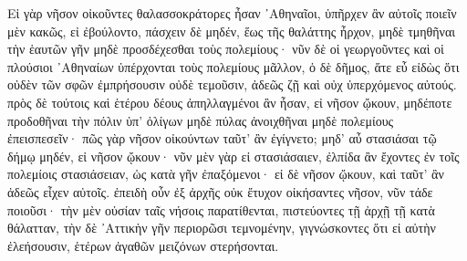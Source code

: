 {\large
\begin{greek}
\noindent Eἰ γὰρ νῆσον οἰκοῦντες θαλασσοκράτορες ἦσαν ᾿Αθηναῖοι, ὑπῆρχεν ἂν αὐτοῖς ποιεῖν μὲν κακῶς, εἰ ἐβούλοντο, πάσχειν δὲ μηδέν, ἕως τῆς θαλάττης ἦρχον, μηδὲ τμηθῆναι τὴν ἑαυτῶν γῆν μηδὲ προσδέχεσθαι τοὺς πολεμίους· νῦν δὲ οἱ γεωργοῦντες καὶ οἱ πλούσιοι ᾿Αθηναίων ὑπέρχονται τοὺς πολεμίους μᾶλλον, ὁ δὲ δῆμος, ἅτε εὖ εἰδὼς ὅτι οὐδὲν τῶν σφῶν ἐμπρήσουσιν οὐδὲ τεμοῦσιν, ἀδεῶς ζῇ καὶ οὐχ ὑπερχόμενος αὐτούς. πρὸς δὲ τούτοις καὶ ἑτέρου δέους ἀπηλλαγμένοι ἂν ἦσαν, εἰ νῆσον ᾤκουν, μηδέποτε προδοθῆναι τὴν πόλιν ὑπ' ὀλίγων μηδὲ πύλας ἀνοιχθῆναι μηδὲ πολεμίους ἐπεισπεσεῖν· πῶς γὰρ νῆσον οἰκούντων ταῦτ' ἂν ἐγίγνετο; μηδ' αὖ στασιάσαι τῷ δήμῳ μηδέν, εἰ νῆσον ᾤκουν· νῦν μὲν γὰρ εἰ στασιάσαιεν, ἐλπίδα ἂν ἔχοντες ἐν τοῖς πολεμίοις στασιάσειαν, ὡς κατὰ γῆν ἐπαξόμενοι· εἰ δὲ νῆσον ᾤκουν, καὶ ταῦτ' ἂν ἀδεῶς εἶχεν αὐτοῖς. ἐπειδὴ οὖν ἐξ ἀρχῆς οὐκ ἔτυχον οἰκήσαντες νῆσον, νῦν τάδε ποιοῦσι· τὴν μὲν οὐσίαν ταῖς νήσοις παρατίθενται, πιστεύοντες τῇ ἀρχῇ τῇ κατὰ θάλατταν, τὴν δὲ ᾿Αττικὴν γῆν περιορῶσι τεμνομένην, γιγνώσκοντες ὅτι εἰ αὐτὴν ἐλεήσουσιν, ἑτέρων ἀγαθῶν μειζόνων στερήσονται.

\end{greek}
}
\newpage


